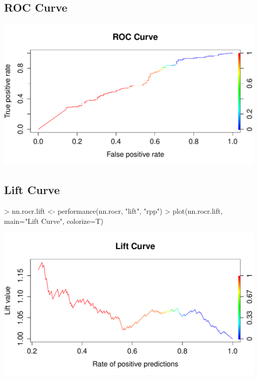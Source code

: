 \documentclass{article}
\begin{document}
\subsection*{ROC Curve}
\begin{Schunk}
\end{Schunk}
\includegraphics[width=0.98\textwidth]{ROCCurveNN.pdf}


\subsection*{Lift Curve}
\begin{Schunk}
\begin{Sinput}
> nn.rocr.lift <- performance(nn.rocr, "lift", "rpp")
> plot(nn.rocr.lift, main="Lift Curve", colorize=T)
\end{Sinput}
\end{Schunk}
\includegraphics[width=0.98\textwidth]{LiftCurveNN.pdf}
\end{document}
